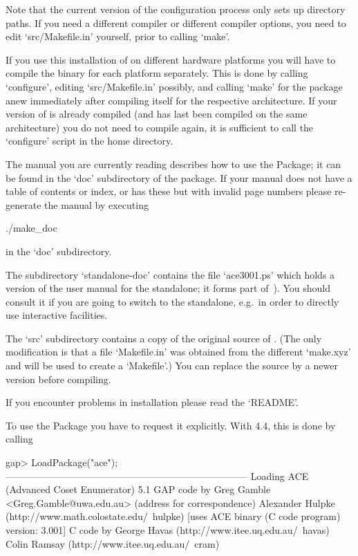 Note that the  current version of the configuration  process only sets
up  directory paths.  If you  need a  different compiler  or different
compiler options, you need to edit `src/Makefile.in'  yourself,  prior
to calling `make'.

If you use this installation of {\GAP} on different hardware platforms
you will have to compile the binary for each platform separately. This
is done by calling `configure',  editing  `src/Makefile.in'  possibly,
and calling `make' for the package anew  immediately  after  compiling
{\GAP} itself for the respective  architecture.  If  your  version  of
{\GAP} is already compiled (and has last been  compiled  on  the  same
architecture)  you  do  not  need  to  compile  {\GAP}  again,  it  is
sufficient  to  call  the  `configure'  script  in  the  {\GAP}   home
directory.

The manual you are currently reading describes how to use  the  {\ACE}
Package; it can be found in the `doc' subdirectory of the package.  If
your manual does not have a table of contents or index, or  has  these
but with  invalid  page  numbers  please  re-generate  the  manual  by
executing

\begintt
./make_doc
\endtt

in the `doc' subdirectory.

The subdirectory `standalone-doc' contains the file `ace3001.ps' which
holds a version of the user manual for the {\ACE} standalone; it forms
part of~\cite{Ram99ace}). You should consult  it  if  you  are  going  to
switch to  the  {\ACE}  standalone,  e.g.~in  order  to  directly  use
interactive facilities.

The  `src' subdirectory  contains a  copy  of the  original source  of
{\ACE}.  (The  only modification  is  that  a  file `Makefile.in'  was
obtained from  the different `make.xyz' and  will be used  to create a
`Makefile'.)  You  can replace  the source by  a newer  version before
compiling.

If you encounter problems in installation please read the `README'.


To use the {\ACE} Package you have  to  request  it  explicitly.  With
{\GAP} 4.4, this is done by calling

\beginexample
gap> LoadPackage("ace");
---------------------------------------------------------------------------
Loading    ACE (Advanced Coset Enumerator) 5.1
GAP code by Greg Gamble <Greg.Gamble@uwa.edu.au> (address for correspondence)
       Alexander Hulpke (http://www.math.colostate.edu/~hulpke)
           [uses ACE binary (C code program) version: 3.001]
C code by  George Havas (http://www.itee.uq.edu.au/~havas)
           Colin Ramsay (http://www.itee.uq.edu.au/~cram)

